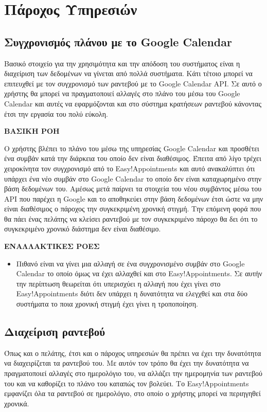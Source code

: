 \section {Πάροχος Υπηρεσιών}
\subsection {Συγχρονισμός πλάνου με το Google Calendar}
Βασικό στοιχείο για την χρησιμότητα και την απόδοση του συστήματος είναι η διαχείριση των δεδομένων να γίνεται από πολλά συστήματα. Κάτι τέτοιο μπορεί να επιτευχθεί με τον συγχρονισμό των ραντεβού με το Google Calendar API. Σε αυτό ο χρήστης θα μπορεί να πραγματοποιεί αλλαγές στο πλάνο του μέσω του Google Calendar και αυτές να εφαρμόζονται και στο σύστημα κρατήσεων ραντεβού κάνοντας έτσι την εργασία του πολύ εύκολη.

\textbf{ΒΑΣΙΚΗ ΡΟΗ}

Ο χρήστης βλέπει το πλάνο του μέσω της υπηρεσίας Google Calendar και προσθέτει ένα συμβάν κατά την διάρκεια του οποίο δεν είναι διαθέσιμος. Έπειτα από λίγο τρέχει χειροκίνητα τον συγχρονισμό από το Easy!Appointments και αυτό ανακαλύπτει ότι υπάρχει ένα νέο συμβάν στο Google Calendar το οποίο δεν είναι καταχωρημένο στην βάση δεδομένων του. Αμέσως μετά παίρνει τα στοιχεία του νέου συμβάντος μέσω του API που παρέχει η Google και το αποθηκεύει στην βάση δεδομένων έτσι ώστε να μην είναι διαθέσιμος ο πάροχος την συγκεκριμένη χρονική στιγμή. Την επόμενη φορά που θα πάει ένας πελάτης να κλείσει ραντεβού με τον συγκεκριμένο πάροχο θα δει ότι το συγκεκριμένο χρονικό διάστημα δεν είναι διαθέσιμο.

\textbf{ΕΝΑΛΛΑΚΤΙΚΕΣ ΡΟΕΣ}

\begin{itemize}
\item Πιθανό είναι να γίνει μια αλλαγή σε ένα συγχρονισμένο συμβάν στο Google Calendar το οποίο όμως να έχει αλλαχθεί και στο Easy!Appointments. Σε αυτήν την περίπτωση θεωρείται ότι υπερισχύει η αλλαγή που έχει γίνει στο Easy!Appointments διότι δεν υπάρχει η δυνατότητα να ελεγχθεί και στα δύο συστήματα το ποια χρονική στιγμή έχει γίνει η τροποποίηση.
\end{itemize}

\subsection {Διαχείριση ραντεβού}
Όπως και ο πελάτης, έτσι και ο πάροχος υπηρεσιών θα πρέπει να έχει την δυνατότητα να διαχειρίζεται τα ραντεβού του. Με αυτόν τον τρόπο θα έχει την δυνατότητα να πραγματοποιεί αλλαγές στο ημερολόγιο του, να αλλάζει την ημερομηνία των ραντεβού του και να καθορίζει το πλάνο του καταπώς τον βολεύει. Το Easy!Appointments εμφανίζει όλα τα ραντεβού σε ημερολόγιο, στο οποίο ο χρήστης μπορεί να περιηγηθεί χρονικά.

